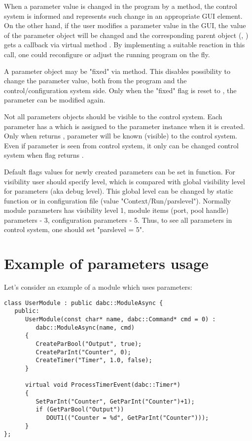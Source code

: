 When a parameter value is changed in the program by a  method, 
the control system is informed and represents such change in an appropriate GUI element.
On the other hand, if the user modifies a parameter value in the GUI, 
the value of the parameter object will be changed and the corresponding parent object 
(, ) gets a callback via 
virtual method . 
By implementing a suitable reaction in this call, 
one could reconfigure or adjust the running program on the fly.

A parameter object may be "fixed" via  method. 
This disables possibility to change the parameter value, both
from the program and the control/configuration system side. 
Only when the "fixed" flag is reset to ,
the parameter can be modified again.

Not all parameters objects should be visible to the control system. 
Each parameter has a  
which is assigned to the parameter instance when it is created.
Only when  returns , parameter will be  
known (visible) to the control system. Even if parameter is seen
from control system, it only can be changed  control system 
when flag  returns . 
   
Default flags values for newly created parameters can be set in
 function.
For visibility user should specify level, which is compared with
global visibility level for parameters (aka debug level).
This global level can be changed by
 static function or
in configuration file (value "Context/Run/parslevel"). Normally module parameters
has visibility level 1, module items (port, pool handle) parameters - 3, 
configuration parameters - 5. 
Thus, to see all parameters in control system, one should set "parslevel = 5".


\section{Example of parameters usage}
\label{prog_setup_parameterexample}
Let's consider an example of a module which uses parameters:

\begin{verbatim}
class UserModule : public dabc::ModuleAsync {
   public:
      UserModule(const char* name, dabc::Command* cmd = 0) : 
         dabc::ModuleAsync(name, cmd)
      {
         CreateParBool("Output", true);
         CreateParInt("Counter", 0);
         CreateTimer("Timer", 1.0, false);
      }
      
      virtual void ProcessTimerEvent(dabc::Timer*)
      {
         SetParInt("Counter", GetParInt("Counter")+1);
         if (GetParBool("Output")) 
            DOUT1(("Counter = %d", GetParInt("Counter")));
      }
}; 
\end{verbatim}


